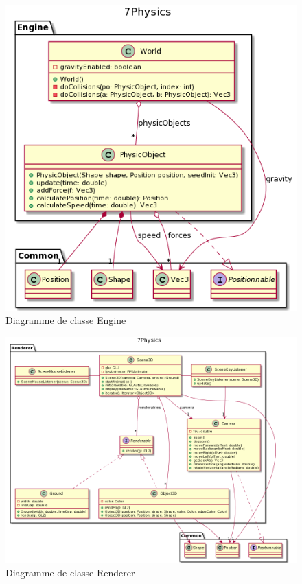 \documentclass[11pt]{report}
\begin{document}
\begin{figure}[h]
  \centering
  \includegraphics[scale=0.75]{./Engine.png}
  \caption{Diagramme de classe Engine}
\end{figure}

\begin{figure}[h]
  \centering
  \includegraphics[angle=90, width=15cm]{./Renderer.png}
  \caption{Diagramme de classe Renderer}
\end{figure}
\end{document}
